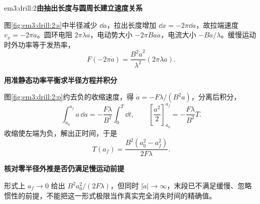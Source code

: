 \begin{drillsolution}{em3:drill:2}\textbf{由抽出长度与圆周长建立速度关系}\par\nobreak
图\ref{fig:em3:drill:2:s}中半径减少 $\dd a$，拉出长度增加 $\dd x=-2\pi\dd a$，故拉端速度 $v_x=-2\pi\dot a$。圆环电阻 $2\pi\lambda a$，电动势大小 $-2\pi Ba\dot a$，电流大小 $-B\dot a/\lambda$。缓慢运动时外功率等于发热率，
\[F(-2\pi\dot a)=\frac{B^2\dot a^2}{\lambda^2}(2\pi\lambda a).\]



\par\medskip{}\noindent\textbf{用准静态功率平衡求半径方程并积分}\par\nobreak
图\ref{fig:em3:drill:2:p}约去负的收缩速度，得 $\dot a=-F\lambda/(B^2a)$，分离后积分，
\[
\int_{a_0}^{a_f}a\,\dd a=-\frac{F\lambda}{B^2}\int_0^T\dd t,
\qquad
\left[\frac{a^2}{2}\right]_{a_0}^{a_f}
=-\frac{F\lambda}{B^2}T.
\]
收缩使左端为负，解出正时间，于是
\[T(a_f)=\frac{B^2(a_0^2-a_f^2)}{2F\lambda}.\]


\par\medskip{}\noindent\textbf{核对零半径外推是否仍满足慢运动前提}\par\nobreak
形式上 $a_f\to0$ 给出 $B^2a_0^2/(2F\lambda)$，但同时 $|\dot a|\to\infty$，末段已不满足缓慢、忽略惯性的前提，不能把这一形式极限当作真实完全消失时间的精确值。\end{drillsolution}
